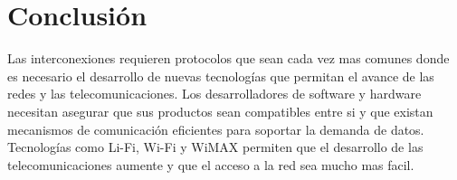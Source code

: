 \documentclass[10pt,journal,compsoc]{IEEEtran}
\begin{document}
%






\section{Conclusión}

Las interconexiones requieren protocolos que sean cada vez mas comunes donde es necesario el desarrollo de nuevas tecnologías que permitan el avance de las redes y las telecomunicaciones. Los desarrolladores de software y hardware necesitan asegurar que sus productos sean compatibles entre si y que existan mecanismos de comunicación eficientes para soportar la demanda de datos. Tecnologías como Li-Fi, Wi-Fi y WiMAX permiten que el desarrollo de las telecomunicaciones aumente y que el acceso a la red sea mucho mas facil.
\end{document}

